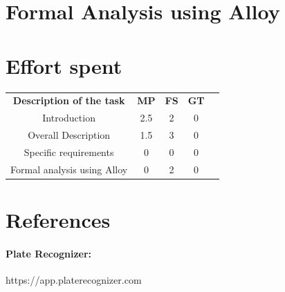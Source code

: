 \documentclass{article}
\begin{document}
\newpage
\section{Formal Analysis using Alloy}

\newpage
\section{Effort spent}
\begin{center}
    \begin{tabular}{c|c|c|c|c}
        \hline
        \textbf{Description of the task} & \textbf{MP} & \textbf{FS} &
        \textbf{GT} \\
        Introduction                    & 2.5   & 2     & 0     \\
        Overall Description             & 1.5   & 3   & 0     \\
        Specific requirements           & 0     & 0     & 0     \\
        Formal analysis using Alloy     & 0     & 2     & 0     \\
    \end{tabular}
\end{center}
\section{References}
    \paragraph{Plate Recognizer:} https://app.platerecognizer.com
    
\end{document}
